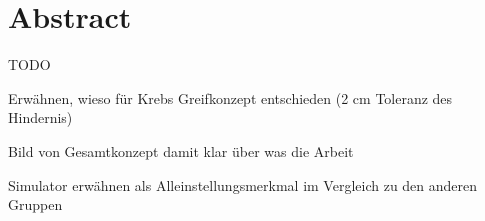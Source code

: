 \newpage
\section{Abstract}

TODO

Erwähnen, wieso für Krebs Greifkonzept entschieden (2 cm Toleranz des Hindernis)

Bild von Gesamtkonzept damit klar über was die Arbeit

Simulator erwähnen als Alleinstellungsmerkmal im Vergleich zu den anderen Gruppen